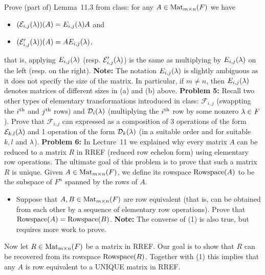 \documentclass[11pt]{amsart}
\begin{document}
Prove (part of) Lemma~11.3 from class: for any $A\in {\rm Mat}_{m\times n}(F)$ we have
\begin{itemize}
\item[(a)] $(\mathcal E_{i,j}({\lambda}))(A)=E_{i,j}({\lambda})A$ and
\item[(b)] $(\mathcal E'_{i,j}({\lambda}))(A)=A E_{i,j}({\lambda})$,
\end{itemize}
that is, applying $E_{i,j}({\lambda})$ (resp. $\mathcal E'_{i,j}({\lambda})$) is the same as multiplying by
$E_{i,j}({\lambda})$ on the left (resp. on the right).
\skv
{\bf Note:} The notation $E_{i,j}({\lambda})$ is slightly ambiguous as it does not specify the size of the matrix. In particular,
if $m\neq n$, then $E_{i,j}({\lambda})$ denotes matrices of different sizes in (a) and (b) above.
\skv
{\bf Problem 5:} Recall two other types of elementary transformations introduced in class: $\mathcal F_{i,j}$ (swappting the
$i^{\rm th}$ and $j^{\rm th}$ rows) and $\mathcal D_i({\lambda})$ (multiplying the $i^{\rm th}$ row by some nonzero ${\lambda} \in F$).
Prove that $\mathcal F_{i,j}$ can expressed as a composition of 3 operations of the form $\mathcal E_{k,l} ({\lambda})$
and 1 operation of the form $\mathcal D_k({\lambda})$ (in a suitable order and for suitable $k,l$ and ${\lambda}$).
\skv
{\bf Problem 6:} In Lecture~11 we explained why every matrix $A$ can be reduced to a matrix $R$ in RREF (reduced row echelon form)
using elementary row operations. The ultimate goal of this problem is to prove that such a matrix $R$ is unique. 
Given $A\in {\rm Mat}_{m\times n}(F)$, we define its rowspace ${\rm Rowspace}(A)$ to be the subspace of $F^n$ spanned by the rows of $A$.
\begin{itemize}
\item[(1)] Suppose that $A,B\in {\rm Mat}_{m\times n}(F)$ are row equivalent (that is, can be obtained from each other by a sequence
of elementary row operations). Prove that ${\rm Rowspace}(A)={\rm Rowspace}(B)$. {\bf Note:} The converse of (1) is also true, but 
requires more work to prove.
\end{itemize}
Now let $R\in{\rm Mat}_{m\times n}(F)$ be a matrix in RREF. Our goal is to show that $R$ can be recovered from its rowspace ${\rm Rowspace}(R)$. 
Together with (1) this implies that any $A$ is row equivalent to a UNIQUE matrix in RREF.
\end{document}
